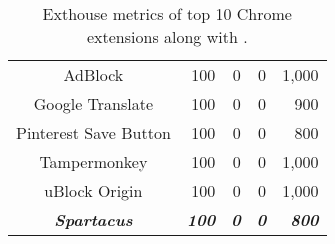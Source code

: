 {\begin{table}[t]
{\begin{tabular}{crrrr}
\rowcolor[HTML]{C0C0C0} 
AdBlock                     & 100                                & 0                                                                                        & 0                                                                                              & 1,000                                                                            \\
\rowcolor[HTML]{EFEFEF} 
Google Translate            & 100                                & 0                                                                                        & 0                                                                                              & 900                                                                              \\
\rowcolor[HTML]{C0C0C0} 
Pinterest Save Button       & 100                                & 0                                                                                        & 0                                                                                              & 800                                                                              \\
\rowcolor[HTML]{EFEFEF} 
Tampermonkey                & 100                                & 0                                                                                        & 0                                                                                              & 1,000                                                                            \\
\rowcolor[HTML]{C0C0C0} 
uBlock Origin               & 100                                & 0                                                                                        & 0                                                                                              & 1,000                                                                            \\ \midrule
\textit{\textbf{Spartacus}} & \textit{\textbf{100}}              & \textit{\textbf{0}}                                                                      & \textit{\textbf{0}}                                                                            & \textit{\textbf{800}}                                                            \\ \bottomrule
\end{tabular}
}
\caption{Exthouse metrics of top 10 Chrome extensions along with \spartacus.}
\label{tab:exthouse}
\end{table}
}